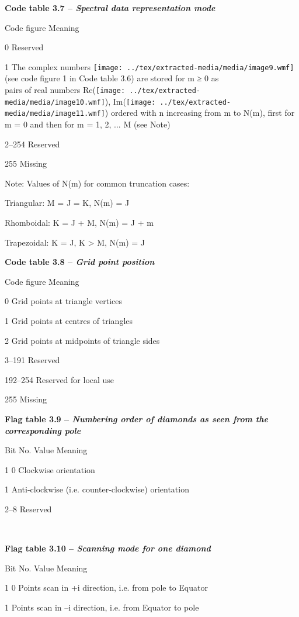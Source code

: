 \textbf{Code table 3.7 -- \emph{Spectral data representation mode}}

Code figure Meaning

0 Reserved

1 The complex numbers \texttt{[image: ../tex/extracted-media/media/image9.wmf]}(see code figure 1 in Code table 3.6) are stored for m ≥ 0 as\\
pairs of real numbers Re(\texttt{[image: ../tex/extracted-media/media/image10.wmf]}), Im(\texttt{[image: ../tex/extracted-media/media/image11.wmf]}) ordered with n increasing from m to N(m), first for\\
m = 0 and then for m = 1, 2, ... M (see Note)

2--254 Reserved

255 Missing

Note: Values of N(m) for common truncation cases:

Triangular: M = J = K, N(m) = J

Rhomboidal: K = J + M, N(m) = J + m

Trapezoidal: K = J, K \textgreater{} M, N(m) = J

\textbf{Code table 3.8 -- \emph{Grid point position}}

Code figure Meaning

0 Grid points at triangle vertices

1 Grid points at centres of triangles

2 Grid points at midpoints of triangle sides

3--191 Reserved

192--254 Reserved for local use

255 Missing

\textbf{Flag table 3.9 -- \emph{Numbering order of diamonds as seen from the corresponding pole}}

Bit No. Value Meaning

1 0 Clockwise orientation

1 Anti-clockwise (i.e. counter-clockwise) orientation

2--8 Reserved

\textbf{\\
}

\textbf{Flag table 3.10 -- \emph{Scanning mode for one diamond}}

Bit No. Value Meaning

1 0 Points scan in +i direction, i.e. from pole to Equator

1 Points scan in --i direction, i.e. from Equator to pole


